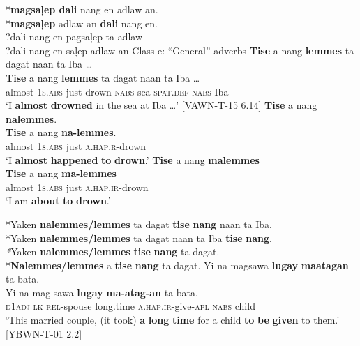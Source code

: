 *\textbf{magsaļep dali} nang en adlaw an. \\
*\textbf{magsaļep} adlaw an \textbf{dali} nang en. \\
?dali nang en pagsaļep ta adlaw \\
?dali nang en saļep adlaw an
\z
Class e: “General” adverbs
\ea
\textbf{Tise}  a  nang  \textbf{lemmes}  ta  dagat  naan  ta  Iba … \\\smallskip
 \gll \textbf{Tise}  a  nang  \textbf{lemmes}  ta  dagat  naan  ta  Iba … \\
almost  1\textsc{s.abs}  just  drown  \textsc{nabs}  sea  \textsc{spat.def}  \textsc{nabs}  Iba \\
\glt ‘I \textbf{almost} \textbf{drowned} in the sea at Iba …’ [VAWN-T-15 6.14]
\z
\ea
\textbf{Tise}  a  nang  \textbf{nalemmes}. \\\smallskip
 \gll \textbf{Tise}  a  nang  \textbf{na-lemmes}. \\
almost  1\textsc{s.abs}  just  \textsc{a.hap.r}-drown \\
\glt`I \textbf{almost} \textbf{happened} \textbf{to} \textbf{drown}.'
\z
\ea
\textbf{Tise}   a  nang \textbf{malemmes} \\\smallskip
 \gll \textbf{Tise}   a  nang \textbf{ma-lemmes} \\
almost  1\textsc{s.abs}  just  \textsc{a.hap.ir}-drown \\
\glt ‘I am \textbf{about} \textbf{to} \textbf{drown}.’ \\\smallskip

*Yaken \textbf{nalemmes/lemmes} ta dagat \textbf{tise} \textbf{nang} naan ta Iba. \\
*Yaken \textbf{nalemmes/lemmes} ta dagat naan ta Iba \textbf{tise} \textbf{nang}. \\
\textit{*}Yaken \textbf{nalemmes/lemmes} \textbf{tise} \textbf{nang} ta dagat. \\
*\textbf{Nalemmes/lemmes} a \textbf{tise} \textbf{nang} ta dagat.
\z
\ea
Yi  na  magsawa  \textbf{lugay}  \textbf{maatagan}  ta  bata. \\\smallskip
 \gll Yi  na  mag-sawa  \textbf{lugay}  \textbf{ma-atag-an}  ta  bata. \\
\textsc{d}1\textsc{adj}  \textsc{lk}  \textsc{rel}-spouse  long.time  \textsc{a.hap.ir}-give-\textsc{apl}  \textsc{nabs}  child \\
\glt ‘This married couple, (it took) \textbf{a} \textbf{long} \textbf{time} for a child \textbf{to} \textbf{be} \textbf{given} to them.’ [YBWN-T-01 2.2] \\\smallskip

